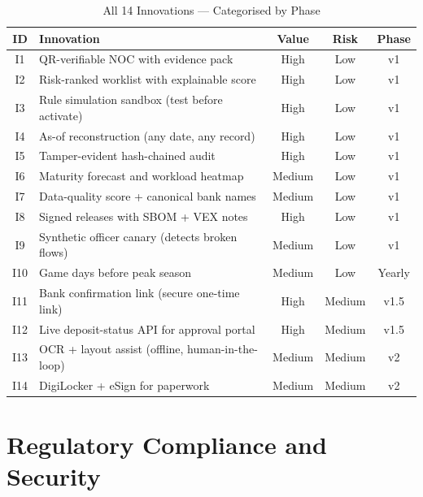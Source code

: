 \documentclass[12pt, a4paper]{report}
\begin{document}
\begin{table}[H]
\centering
\caption{All 14 Innovations — Categorised by Phase}
\label{tab:innovations}
\begin{tabularx}{\textwidth}{|c|X|c|c|c|}
\hline
\textbf{ID} & \textbf{Innovation} & \textbf{Value} & \textbf{Risk} & \textbf{Phase} \\
\hline
I1 & QR-verifiable NOC with evidence pack & High & Low & v1 \\
I2 & Risk-ranked worklist with explainable score & High & Low & v1 \\
I3 & Rule simulation sandbox (test before activate) & High & Low & v1 \\
I4 & As-of reconstruction (any date, any record) & High & Low & v1 \\
I5 & Tamper-evident hash-chained audit & High & Low & v1 \\
I6 & Maturity forecast and workload heatmap & Medium & Low & v1 \\
I7 & Data-quality score + canonical bank names & Medium & Low & v1 \\
I8 & Signed releases with SBOM + VEX notes & High & Low & v1 \\
I9 & Synthetic officer canary (detects broken flows) & Medium & Low & v1 \\
I10 & Game days before peak season & Medium & Low & Yearly \\
I11 & Bank confirmation link (secure one-time link) & High & Medium & v1.5 \\
I12 & Live deposit-status API for approval portal & High & Medium & v1.5 \\
I13 & OCR + layout assist (offline, human-in-the-loop) & Medium & Medium & v2 \\
I14 & DigiLocker + eSign for paperwork & Medium & Medium & v2 \\
\hline
\end{tabularx}
\end{table}


\chapter{Regulatory Compliance and Security}
\end{document}
